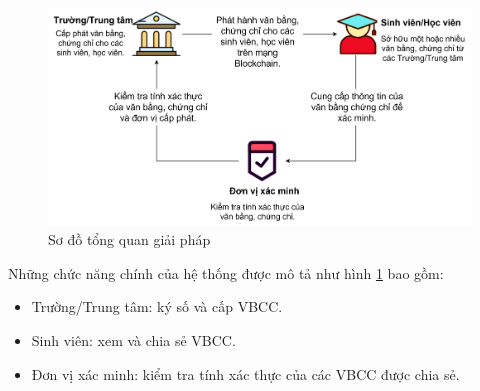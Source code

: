 \begin{figure}[htbp]
\centering
\includegraphics[width=.9\linewidth]{img/vbcc.jpg}
\caption{Sơ đồ tổng quan giải pháp}
\label{fig:vbcc}

\end{figure}
Những chức năng chính của hệ thống được mô tả như hình \ref{fig:vbcc} bao gồm:
\begin{itemize}
\item Trường/Trung tâm: ký số và cấp VBCC.
\item Sinh viên: xem và chia sẻ VBCC.
\item Đơn vị xác minh: kiểm tra tính xác thực của các VBCC được chia sẻ.
\end{itemize}


